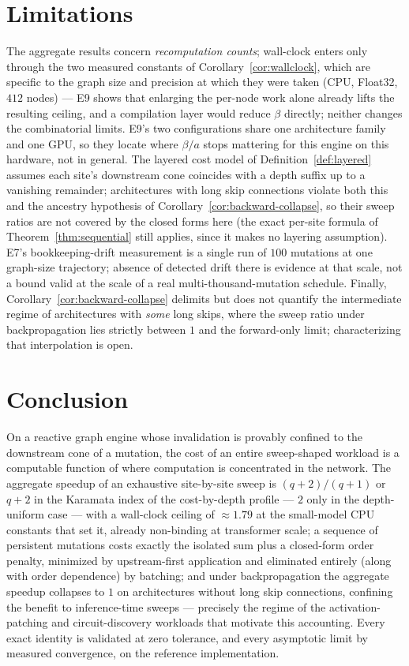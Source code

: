 \documentclass[11pt,a4paper]{article}
\begin{document}
\section{Limitations}
\label{sec:limitations}
The aggregate results concern \emph{recomputation counts}; wall-clock enters only through the two
measured constants of Corollary~\ref{cor:wallclock}, which are specific to the graph size and
precision at which they were taken (CPU, Float32, $412$ nodes) --- E9 shows that enlarging the
per-node work alone already lifts the resulting ceiling, and a compilation layer would reduce
$\beta$ directly; neither changes the combinatorial limits. E9's two configurations share one
architecture family and one GPU, so they locate where $\beta/a$ stops mattering for this engine on
this hardware, not in general. The layered cost model of Definition~\ref{def:layered}
assumes each site's downstream cone coincides with a depth suffix up to a vanishing remainder;
architectures with long skip connections violate both this and the ancestry hypothesis of
Corollary~\ref{cor:backward-collapse}, so their sweep ratios are not covered by the closed forms
here (the exact per-site formula of Theorem~\ref{thm:sequential} still applies, since it makes no
layering assumption). E7's bookkeeping-drift measurement is a single run of $100$ mutations at
one graph-size trajectory; absence of detected drift there is evidence at that scale, not a bound
valid at the scale of a real multi-thousand-mutation schedule. Finally,
Corollary~\ref{cor:backward-collapse} delimits but does not quantify the intermediate regime of
architectures with \emph{some} long skips, where the sweep ratio under backpropagation lies
strictly between $1$ and the forward-only limit; characterizing that interpolation is open.

\section{Conclusion}
On a reactive graph engine whose invalidation is provably confined to the downstream cone of a
mutation, the cost of an entire sweep-shaped workload is a computable function of where
computation is concentrated in the network. The aggregate speedup of an exhaustive site-by-site
sweep is $(q+2)/(q+1)$ or $q+2$ in the Karamata index of the cost-by-depth profile --- $2$ only in
the depth-uniform case --- with a wall-clock ceiling of $\approx 1.79$ at the small-model CPU
constants that set it, already non-binding at transformer scale; a sequence of persistent mutations costs exactly the isolated
sum plus a closed-form order penalty, minimized by upstream-first application and eliminated
entirely (along with order dependence) by batching; and under backpropagation the aggregate
speedup collapses to $1$ on architectures without long skip connections, confining the benefit to
inference-time sweeps --- precisely the regime of the activation-patching and circuit-discovery
workloads that motivate this accounting. Every exact identity is validated at zero tolerance, and
every asymptotic limit by measured convergence, on the reference implementation.
\end{document}
